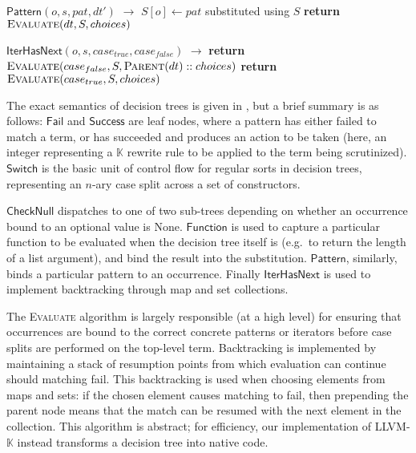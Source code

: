 \documentclass{article}
\theoremstyle{definition}
\newcommand{\K}{$\mathbb{K}$\xspace}
\newcommand{\KL}{LLVM-\K}
\newcommand{\Success}{\mathsf{Success}}
\newcommand{\CheckNull}{\mathsf{CheckNull}}
\newcommand{\IterHasNext}{\mathsf{IterHasNext}}
\newcommand{\Fail}{\mathsf{Fail}}
\newcommand{\Switch}{\mathsf{Switch}}
\newcommand{\FunctionDT}{\mathsf{Function}}
\newcommand{\Pattern}{\mathsf{Pattern}}
\newcommand{\CaseItem}[2]{\State #1 $ \to $ #2}
\newcommand{\ret}{\textbf{return}\xspace}
\begin{document}
\begin{algorithm*}
\begin{algorithmic}[1]
        \CaseItem{$\Pattern(o, s, pat, dt')$}{}
        \Indent
          \State $ S[o] \gets pat $ substituted using $ S $
          \State \ret $ \textsc{Evaluate}(dt, S, choices) $
        \EndIndent

        \CaseItem{$\IterHasNext(o, s, case_{true}, case_{false})$}{}
        \Indent
            \State \ret $ \textsc{Evaluate}(case_{false}, S, \textsc{Parent}(dt) :: choices) $
          \Else
            \State \ret $ \textsc{Evaluate}(case_{true}, S, choices) $
          \EndIf
        \EndIndent
      \EndCase
    \EndFunction
  \end{algorithmic}

\end{algorithm*}

The exact semantics of decision trees is given in
, but a brief summary is as follows: $ \Fail $ and $
\Success $ are leaf nodes, where a pattern
has either failed to match a term, or has succeeded and produces an action to be
taken (here, an integer representing a \K rewrite rule to be applied to the term
being scrutinized). $ \Switch $ is the basic unit of control flow for regular
sorts in decision trees, representing an $n$-ary case split across a set of
constructors.

$ \CheckNull $ dispatches to one of two sub-trees depending on whether an
occurrence bound to an optional value is None. $ \FunctionDT $ is used to
capture a particular function to be evaluated when the decision tree itself is
(e.g.\ to return the length of a list argument), and bind the result into the
substitution. $ \Pattern $, similarly, binds a particular pattern to an
occurrence. Finally $ \IterHasNext $ is used to implement backtracking through
map and set collections.


The \textsc{Evaluate} algorithm is largely responsible (at a high level) for
ensuring that occurrences are bound to the correct concrete patterns or
iterators before case splits are performed on the top-level term. Backtracking
is implemented by maintaining a stack of resumption points from which evaluation
can continue should matching fail. This backtracking is used when choosing
elements from maps and sets: if the chosen element causes matching to fail, then
prepending the parent node means that the match can be resumed with the next
element in the collection.  This algorithm is abstract; for efficiency, our
implementation of \KL instead transforms a decision tree into native code.
\end{document}
